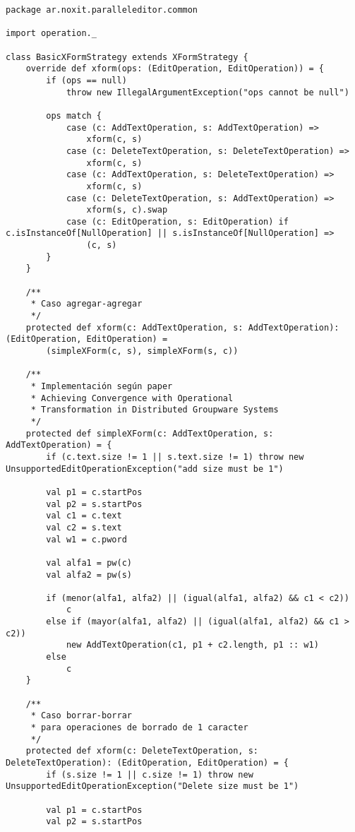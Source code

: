 {
\tiny
\begin{verbatim}
package ar.noxit.paralleleditor.common

import operation._

class BasicXFormStrategy extends XFormStrategy {
    override def xform(ops: (EditOperation, EditOperation)) = {
        if (ops == null)
            throw new IllegalArgumentException("ops cannot be null")

        ops match {
            case (c: AddTextOperation, s: AddTextOperation) =>
                xform(c, s)
            case (c: DeleteTextOperation, s: DeleteTextOperation) =>
                xform(c, s)
            case (c: AddTextOperation, s: DeleteTextOperation) =>
                xform(c, s)
            case (c: DeleteTextOperation, s: AddTextOperation) =>
                xform(s, c).swap
            case (c: EditOperation, s: EditOperation) if c.isInstanceOf[NullOperation] || s.isInstanceOf[NullOperation] =>
                (c, s)
        }
    }

    /**
     * Caso agregar-agregar
     */
    protected def xform(c: AddTextOperation, s: AddTextOperation): (EditOperation, EditOperation) =
        (simpleXForm(c, s), simpleXForm(s, c))

    /**
     * Implementación según paper
     * Achieving Convergence with Operational
     * Transformation in Distributed Groupware Systems
     */
    protected def simpleXForm(c: AddTextOperation, s: AddTextOperation) = {
        if (c.text.size != 1 || s.text.size != 1) throw new UnsupportedEditOperationException("add size must be 1")

        val p1 = c.startPos
        val p2 = s.startPos
        val c1 = c.text
        val c2 = s.text
        val w1 = c.pword

        val alfa1 = pw(c)
        val alfa2 = pw(s)

        if (menor(alfa1, alfa2) || (igual(alfa1, alfa2) && c1 < c2))
            c
        else if (mayor(alfa1, alfa2) || (igual(alfa1, alfa2) && c1 > c2))
            new AddTextOperation(c1, p1 + c2.length, p1 :: w1)
        else
            c
    }

    /**
     * Caso borrar-borrar
     * para operaciones de borrado de 1 caracter
     */
    protected def xform(c: DeleteTextOperation, s: DeleteTextOperation): (EditOperation, EditOperation) = {
        if (s.size != 1 || c.size != 1) throw new UnsupportedEditOperationException("Delete size must be 1")

        val p1 = c.startPos
        val p2 = s.startPos


\end{verbatim}}
